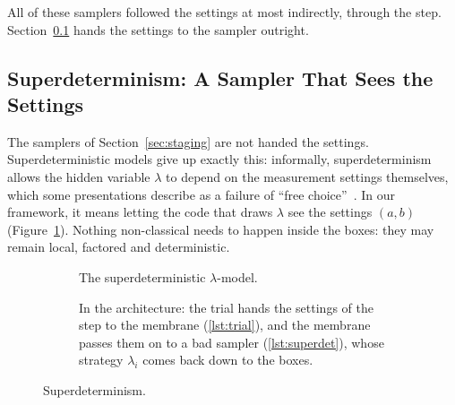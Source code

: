 \documentclass[11pt]{article}
\newcommand{\twoboxes}{%
  \node[fbox] (f) at (0,0) {$f$};
  \node[gbox] (g) at (5.4,0) {$g$};
  \node (a) at (0,1.3) {$a \in \{0,1\}$};
  \node (b) at (5.4,1.3) {$b \in \{0,1\}$};
  \node (x) at (0,-1.3) {$x \in \{\pm1\}$};
  \node (y) at (5.4,-1.3) {$y \in \{\pm1\}$};
  \draw[->] (a) -- (f); \draw[->] (b) -- (g);
  \draw[->] (f) -- (x); \draw[->] (g) -- (y);
  \node[font=\bfseries, anchor=east] at (-1.25,0) {Alice};
  \node[font=\bfseries, anchor=west] at (6.65,0) {Bob};}
\newcommand{\layers}{%
  \path[elayer, ehl] (0,-0.55) rectangle (12.4,0.55);
  \path[mlayer, mhl] (0,-1.42) rectangle (12.4,-0.88);
  \path[tlayer, thl] (0,-3.42) rectangle (12.4,-1.74);
  \node[layername] at (0.18,0.18) {experiment layer};
  \node[layertype, text=CExp] at (0.18,-0.21) {Exp e};
  \node[layername] at (0.18,-1.15) {membrane\quad{\mdseries\ttfamily\color{CMem}RunTrial e t}};
  \node[layername] at (0.18,-2.39) {trial layer};
  \node[layertype, text=CTrial] at (0.18,-2.76) {TrialModel t};
  \node[lnode, schedhl] (sched) at (5.0,0) {scheduler\\[-1pt] {\scriptsize\ttfamily Scheduler e}};
  \node[lnode, samphl] (samp) at (8.0,0) {sampler\\[-1pt] {\scriptsize\ttfamily Sampler e}};
  \node[lnode] (run) at (10.9,0) {runner\\[-1pt] {\scriptsize $i = 0, \ldots, n{-}1$}};
  \node[sfbox] (f) at (4.4,-2.15) {$f$};
  \node[sgbox] (g) at (5.6,-2.15) {$g$};
  \coordinate (J) at (5.0,-1.15);
  \draw[setpath] (sched.south) -- (J);
  \draw[setpath, ->] (J) -- node[left, lbl, pos=0.78] {$a_i$} (f.north);
  \draw[setpath, ->] (J) -- node[right, lbl, pos=0.78] {$b_i$} (g.north);
  \node[lbl, anchor=west] at (5.07,-0.71) {$(a_i, b_i)$};
  \draw[lampath, ->] (samp.south) -- (8.0,-1.15);
  \draw[lampath] (8.0,-1.15) -- (J);
  \node[lbl, anchor=west] at (8.07,-0.71) {$\lambda_i$};
  \fill[black!65] (J) circle (1.3pt);
  \coordinate (K) at (5.0,-3.15);
  \draw[respath] (f.south) -- node[left, lbl, pos=0.3] {$x_i$} (K);
  \draw[respath] (g.south) -- node[right, lbl, pos=0.3] {$y_i$} (K);
  \draw[respath, ->] (K) -| (run.south);
  \fill[black!65] (K) circle (1.3pt);
  \node[lbl, anchor=south] at (8.3,-3.15) {$(x_i, y_i)$};}
\begin{document}
All of these samplers followed the settings at most indirectly, through the step. Section~\ref{sec:superdet} hands the settings to the sampler outright.

\subsection{Superdeterminism: A Sampler That Sees the Settings}\label{sec:superdet}

The samplers of Section~\ref{sec:staging} are not handed the settings. Superdeterministic models give up exactly this: informally, superdeterminism~\citep{HossenfelderPalmer2020,Palmer2009,tHooft2016} allows the hidden variable $\lambda$ to depend on the measurement settings themselves, which some presentations describe as a failure of ``free choice''~\citep{ConwayKochen2006,ConwayKochen2009}. In our framework, it means letting the code that draws $\lambda$ see the settings $(a, b)$ (Figure~\ref{fig:superdet}). Nothing non-classical needs to happen inside the boxes: they may remain local, factored and deterministic.

\begin{figure}[htbp]
\centering
\begin{subfigure}{\linewidth}
\centering
{}
\caption{The superdeterministic $\lambda$-model.}
\end{subfigure}

\vspace{8pt}
\begin{subfigure}{\linewidth}
\centering
{}
\caption{In the architecture: the trial hands the settings of the step to the membrane (\ref{lst:trial}), and the membrane passes them on to a bad sampler (\ref{lst:superdet}), whose strategy $\lambda_i$ comes back down to the boxes.}
\end{subfigure}
\caption{Superdeterminism.}
\label{fig:superdet}
\end{figure}
\end{document}
